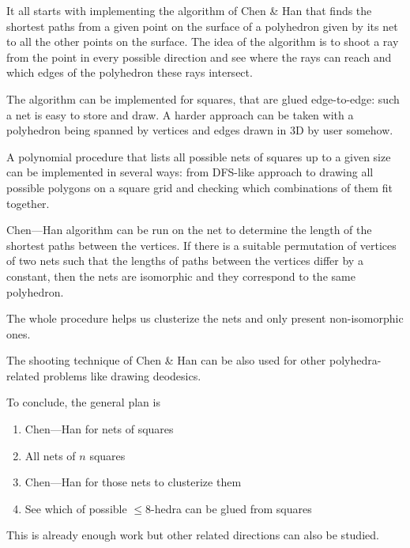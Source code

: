 \documentclass[a4paper,11pt]{article}
\begin{document}
It all starts with implementing the algorithm of Chen \& Han that finds the shortest paths from a given point on the surface of a polyhedron given by its net to all the other points on the surface. The idea of the algorithm is to shoot a ray from the point in every possible direction and see where the rays can reach and which edges of the polyhedron these rays intersect.

The algorithm can be implemented for squares, that are glued edge-to-edge: such a net is easy to store and draw. A harder approach can be taken with a polyhedron being spanned by vertices and edges drawn in 3D by user somehow.

A polynomial procedure that lists all possible nets of squares up to a given size can be implemented in several ways: from DFS-like approach to drawing all possible polygons on a square grid and checking which combinations of them fit together.

Chen—Han algorithm can be run on the net to determine the length of the shortest paths between the vertices. If there is a suitable permutation of vertices of two nets such that the lengths of paths between the vertices differ by a constant, then the nets are isomorphic and they correspond to the same polyhedron.

The whole procedure helps us clusterize the nets and only present non-isomorphic ones.

The shooting technique of Chen \& Han can be also used for other polyhedra-related problems like drawing deodesics.

To conclude, the general plan is

\begin{enumerate}
	\item Chen—Han for nets of squares
	\item All nets of $n$ squares
	\item Chen—Han for those nets to clusterize them
	\item See which of possible $\le 8$-hedra can be glued from squares
\end{enumerate}

This is already enough work but other related directions can also be studied.
\end{document}
